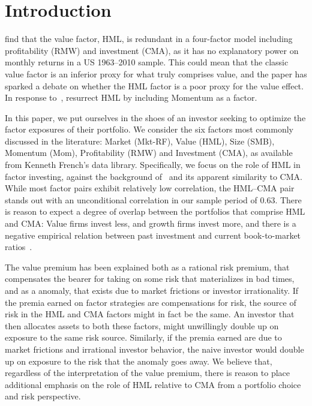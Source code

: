 \section{Introduction}
\textcite{FF2015} find that the value factor, HML, is redundant in a four-factor model including profitability (RMW) and investment (CMA), as it has no explanatory power on monthly returns in a US 1963–2010 sample. This could mean that the classic value factor is an inferior proxy for what truly comprises value, and the paper has sparked a debate on whether the HML factor is a poor proxy for the value effect. In response to~\textcite{FF2015}, \textcite{Asness2015} resurrect HML by including Momentum as a factor.

In this paper, we put ourselves in the shoes of an investor seeking to optimize the factor exposures of their portfolio. We consider the six factors most commonly discussed in the literature: Market (Mkt-RF), Value (HML), Size (SMB), Momentum (Mom), Profitability (RMW) and Investment (CMA), as available from Kenneth French's data library. Specifically, we focus on the role of HML in factor investing, against the background of~\textcite{FF2015,Asness2015} and its apparent similarity to CMA. While most factor pairs exhibit relatively low correlation, the HML--CMA pair stands out with an unconditional correlation in our sample period of 0.63. There is reason to expect a degree of overlap between the portfolios that comprise HML and CMA: Value firms invest less, and growth firms invest more, and there is a negative empirical relation between past investment and current book-to-market ratios~\autocite{Zhang2005,AndersonGarciaFeijoo2006}.

The value premium has been explained both as a rational risk premium, that compensates the bearer for taking on some risk that materializes in bad times, and as a anomaly, that exists due to market frictions or investor irrationality. If the premia earned on factor strategies are compensations for risk, the source of risk in the HML and CMA factors might in fact be the same. An investor that then allocates assets to both these factors, might unwillingly double up on exposure to the same risk source. Similarly, if the premia earned are due to market frictions and irrational investor behavior, the naive investor would double up on exposure to the risk that the anomaly goes away. We believe that, regardless of the interpretation of the value premium, there is reason to place additional emphasis on the role of HML relative to CMA from a portfolio choice and risk perspective.

